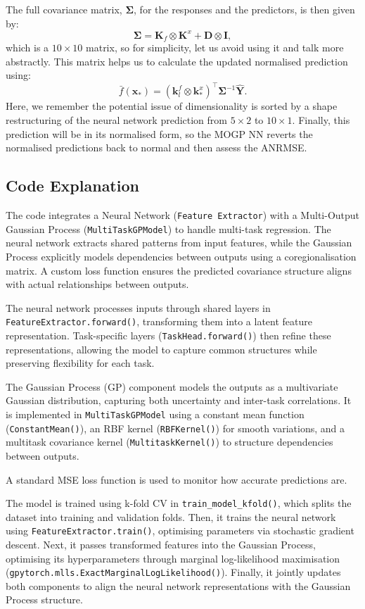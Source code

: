 The full covariance matrix, \(\mathbf{\Sigma}\), for the responses and the predictors, is then given by:
\[
\mathbf{\Sigma} = \mathbf{K}_f \otimes \mathbf{K}^x + \mathbf{D} \otimes \mathbf{I},
\]
\noindent which is a $10 \times 10$ matrix, so for simplicity, let us avoid using it and talk more abstractly. 
This matrix helps us to calculate the updated normalised prediction using:
\[
\bar{f}(\mathbf{x}_*) = (\mathbf{k}_l^f \otimes \mathbf{k}_*^x)^\top\mathbf{\Sigma}^{-1}\mathbf{\hat{Y}}.
\]
Here, we remember the potential issue of dimensionality is sorted by a shape restructuring of the neural network prediction from $5\times 2$ to $10\times1$.
Finally, this prediction will be in its normalised form, so the MOGP NN reverts the normalised predictions back to normal and then assess the ANRMSE.

\subsection{Code Explanation}
The code integrates a Neural Network (\texttt{Feature Extractor}) with a Multi-Output Gaussian Process (\texttt{MultiTaskGPModel}) to handle multi-task regression. The neural network extracts shared patterns from input features, while the Gaussian Process explicitly models dependencies between outputs using a coregionalisation matrix. A custom loss function ensures the predicted covariance structure aligns with actual relationships between outputs.

The neural network processes inputs through shared layers in \texttt{FeatureExtractor.forward()}, transforming them into a latent feature representation. Task-specific layers (\texttt{TaskHead.forward()}) then refine these representations, allowing the model to capture common structures while preserving flexibility for each task.

The Gaussian Process (GP) component models the outputs as a multivariate Gaussian distribution, capturing both uncertainty and inter-task correlations. It is implemented in \texttt{MultiTaskGPModel} using a constant mean function (\texttt{ConstantMean()}), an RBF kernel (\texttt{RBFKernel()}) for smooth variations, and a multitask covariance kernel (\texttt{MultitaskKernel()}) to structure dependencies between outputs.

A standard MSE loss function is used to monitor how accurate predictions are.

The model is trained using k-fold CV in \texttt{train\_model\_kfold()}, which splits the dataset into training and validation folds.
Then, it trains the neural network using \texttt{FeatureExtractor.train()}, optimising parameters via stochastic gradient descent.
Next, it passes transformed features into the Gaussian Process, optimising its hyperparameters through marginal log-likelihood maximisation (\texttt{gpytorch.mlls.ExactMarginalLogLikelihood()}).
Finally, it jointly updates both components to align the neural network representations with the Gaussian Process structure.

